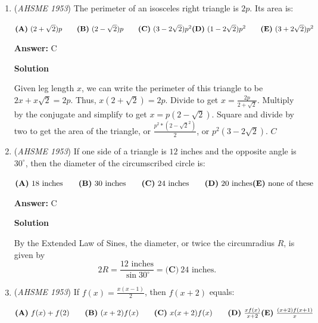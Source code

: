 \begin{enumerate}
 Since $\angle HAE = \angle FBE = \angle FCG = \angle HDG = 30^{\circ}$, by SAS, $\triangle HAE \cong \triangle FBE \cong \triangle FCG = \triangle HDG$, and thus $HE = FE = FG = HG$, so $EFGH$ is $\boxed{\textbf{(D)}\ \text{a rhombus}}$. 

 \textbf{Remark} If $\frac{BC}{AB} = \sqrt{3}$, then $F = H$ and the rhombus formed is degenerate.

 


	\item (\textit{AHSME 1953}) The perimeter of an isosceles right triangle is $2p$. Its area is: 


 $\textbf{(A)}\ (2+\sqrt{2})p \qquad \textbf{(B)}\ (2-\sqrt{2})p \qquad \textbf{(C)}\ (3-2\sqrt{2})p^2\\  \textbf{(D)}\ (1-2\sqrt{2})p^2\qquad \textbf{(E)}\ (3+2\sqrt{2})p^2$

 \textbf{Answer: }C



\textbf{Solution}

Given leg length $x$, we can write the perimeter of this triangle to be $2x+x\sqrt{2}=2p$. Thus, $x(2+\sqrt{2})=2p$. Divide to get $x=\frac{2p}{2+\sqrt{2}}$. Multiply by the conjugate and simplify to get $x=p(2-\sqrt{2})$. Square and divide by two to get the area of the triangle, or $\frac{p^2*(2-\sqrt{2}^2)}{2}$, or $p^2(3-2\sqrt{2})$. $\boxed{C}$



	\item (\textit{AHSME 1953}) If one side of a triangle is $12$ inches and the opposite angle is $30^{\circ}$, then the diameter of the circumscribed circle is: 


 $\textbf{(A)}\ 18\text{ inches} \qquad \textbf{(B)}\ 30\text{ inches} \qquad \textbf{(C)}\ 24\text{ inches} \qquad \textbf{(D)}\ 20\text{ inches}\\ \textbf{(E)}\ \text{none of these}$

 \textbf{Answer: }C



\textbf{Solution}

By the Extended Law of Sines, the diameter, or twice the circumradius $R$, is given by
 \[2R=\frac{12\text{ inches}}{\sin30^\circ}=\boxed{\textbf{(C)}\ 24\text{ inches}}.\]



	\item (\textit{AHSME 1953}) If $f(x)=\frac{x(x-1)}{2}$, then $f(x+2)$ equals: 


 $\textbf{(A)}\ f(x)+f(2) \qquad \textbf{(B)}\ (x+2)f(x) \qquad \textbf{(C)}\ x(x+2)f(x) \qquad \textbf{(D)}\ \frac{xf(x)}{x+2}\\ \textbf{(E)}\ \frac{(x+2)f(x+1)}{x}$


\end{enumerate}
